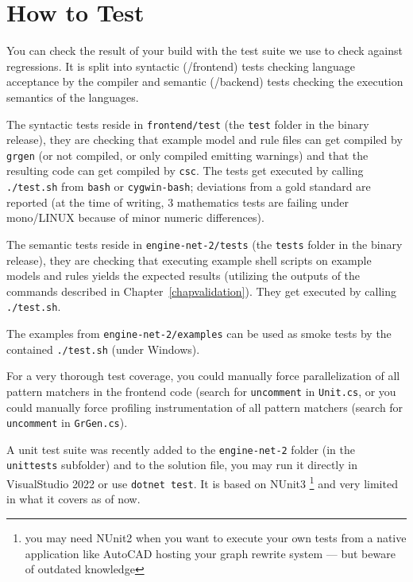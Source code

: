 \pagebreak


\section{How to Test}\label{sub:testing}

You can check the result of your build with the test suite we use to check against regressions.
It is split into syntactic (/frontend) tests checking language acceptance by the compiler
and semantic (/backend) tests checking the execution semantics of the languages.

The syntactic tests reside in \texttt{frontend/test} (the \texttt{test} folder in the binary release), they are checking that example model and rule files can get compiled by \texttt{grgen} (or not compiled, or only compiled emitting warnings) and that the resulting code can get compiled by \texttt{csc}.
The tests get executed by calling \texttt{./test.sh} from \texttt{bash} or \texttt{cygwin-bash};
deviations from a gold standard are reported (at the time of writing, 3 mathematics tests are failing under mono/LINUX because of minor numeric differences).

The semantic tests reside in \texttt{engine-net-2/tests} (the \texttt{tests} folder in the binary release), they are checking that executing example shell scripts on example models and rules yields the expected results (utilizing the outputs of the commands described in Chapter~\ref{chapvalidation}).
They get executed by calling \texttt{./test.sh}.

The examples from \texttt{engine-net-2/examples} can be used as smoke tests by the contained \texttt{./test.sh} (under Windows).

For a very thorough test coverage, you could manually force parallelization of all pattern matchers in the frontend code (search for \texttt{uncomment} in \texttt{Unit.cs}, or you could manually force profiling instrumentation of all pattern matchers (search for \texttt{uncomment} in \texttt{GrGen.cs}).

A unit test suite was recently added to the \texttt{engine-net-2} folder (in the \texttt{unittests} subfolder) and to the solution file, you may run it directly in VisualStudio 2022 or use \texttt{dotnet test}.
It is based on NUnit3 
\footnote{you may need NUnit2 when you want to execute your own tests from a native application like AutoCAD hosting your graph rewrite system --- but beware of outdated knowledge}
and very limited in what it covers as of now.

